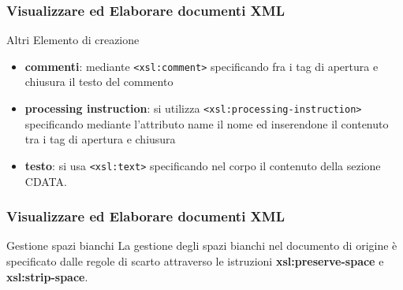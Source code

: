 \begin{frame}
    \frametitle{Visualizzare ed Elaborare documenti XML}
    \addtocounter{nframe}{1}
    

     \begin{block}{Altri Elemento di creazione}
        \begin{itemize}
            \item \textbf{commenti}: mediante \texttt{<xsl:comment>} specificando fra i tag di apertura e chiusura il testo del commento
            \item \textbf{processing instruction}: si utilizza \texttt{<xsl:processing-instruction>} specificando mediante l’attributo name il nome ed inserendone il contenuto tra i tag di apertura e chiusura
            \item \textbf{testo}: si usa \texttt{<xsl:text>} specificando nel corpo il contenuto della sezione CDATA.
        \end{itemize}
     \end{block}

\end{frame}

\begin{frame}
    \frametitle{Visualizzare ed Elaborare documenti XML}
    \addtocounter{nframe}{1}
    

     \begin{block}{Gestione spazi bianchi}
        La gestione degli spazi bianchi nel documento di origine è specificato dalle regole di scarto attraverso le istruzioni \textbf{xsl:preserve-space} e \textbf{xsl:strip-space}.
     \end{block}

\end{frame}


